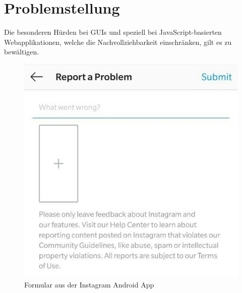 

\section{Problemstellung}

Die besonderen Hürden bei GUIs und speziell bei JavaScript-basierten Webapplikationen, welche die Nachvollziehbarkeit einschränken, gilt es zu bewältigen.

\begin{figure}
	\centering
	\vspace{-\baselineskip}
	\includegraphics[width=\linewidth]{img/instagram-feedback/instagram-feedback.jpg}
	\caption{Formular aus der Instagram \cite{Instagram} Android App}
	\label{fig:instagram-feedback-example}
\end{figure}

